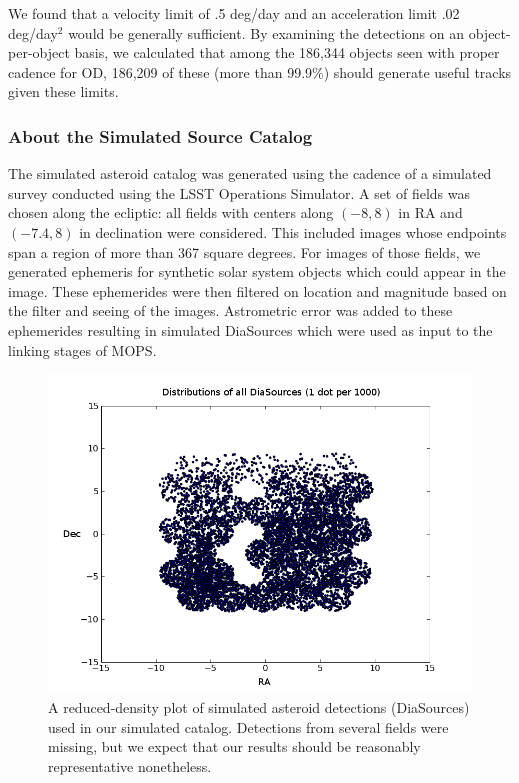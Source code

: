 \documentclass[12pt,preprint]{aastex}
\begin{document}
We found that a velocity limit of .5 deg/day and an acceleration limit
.02 deg/day$^2$ would be generally sufficient.  By examining the
detections on an object-per-object basis, we calculated that among the
186,344 objects seen with proper cadence for OD, 186,209 of these
(more than 99.9\%) should generate useful tracks given these limits.



\subsubsection{About the Simulated Source Catalog}
\label{sourceCatalog}
The simulated asteroid catalog was generated using the cadence of a
simulated survey conducted using the LSST Operations Simulator.  A set
of fields was chosen along the ecliptic: all fields with centers along
$(-8, 8)$ in RA and $(-7.4, 8)$ in declination were considered.  This
included images whose endpoints span a region of more than 367 square
degrees. For images of those fields, we generated ephemeris for
synthetic solar system objects which could appear in the image.  These
ephemerides were then filtered on location and magnitude based on the
filter and seeing of the images.  Astrometric error was added to these
ephemerides resulting in simulated DiaSources which were used as input
to the linking stages of MOPS.


\begin{figure}[ht!]
\centering
\includegraphics[scale=.7]{illustrations/allDias_1_1000th_density.png}
\caption{A reduced-density plot of simulated asteroid detections (DiaSources) used in our simulated catalog.  Detections from several fields were missing, but we expect that our results should be reasonably representative nonetheless.}
\label{diasPlot}
\end{figure}
\end{document}
